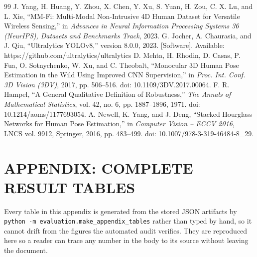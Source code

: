 \documentclass[12pt,a4paper]{report}
\begin{document}
\begin{thebibliography}{99}
 J. Yang, H. Huang, Y. Zhou, X. Chen, Y. Xu, S. Yuan, H. Zou, C. X. Lu, and L. Xie, ``MM-Fi: Multi-Modal Non-Intrusive 4D Human Dataset for Versatile Wireless Sensing,'' in \emph{Advances in Neural Information Processing Systems 36 (NeurIPS), Datasets and Benchmarks Track}, 2023.
 G. Jocher, A. Chaurasia, and J. Qiu, ``Ultralytics YOLOv8,'' version 8.0.0, 2023. [Software]. Available: https://github.com/ultralytics/ultralytics
 D. Mehta, H. Rhodin, D. Casas, P. Fua, O. Sotnychenko, W. Xu, and C. Theobalt, ``Monocular 3D Human Pose Estimation in the Wild Using Improved CNN Supervision,'' in \emph{Proc. Int. Conf. 3D Vision (3DV)}, 2017, pp. 506--516. doi: 10.1109/3DV.2017.00064.
 F. R. Hampel, ``A General Qualitative Definition of Robustness,'' \emph{The Annals of Mathematical Statistics}, vol. 42, no. 6, pp. 1887--1896, 1971. doi: 10.1214/aoms/1177693054.
 A. Newell, K. Yang, and J. Deng, ``Stacked Hourglass Networks for Human Pose Estimation,'' in \emph{Computer Vision -- ECCV 2016}, LNCS vol. 9912, Springer, 2016, pp. 483--499. doi: 10.1007/978-3-319-46484-8\_29.
\end{thebibliography}

\appendix

\newpage

\chapter*{APPENDIX: COMPLETE RESULT TABLES}
\setcounter{table}{0}
\renewcommand{\thetable}{A.\arabic{table}}

Every table in this appendix is generated from the stored JSON artifacts by
\texttt{python -m evaluation.make\_appendix\_tables} rather than typed by hand,
so it cannot drift from the figures the automated audit verifies. They are
reproduced here so a reader can trace any number in the body to its source
without leaving the document.


\end{document}
